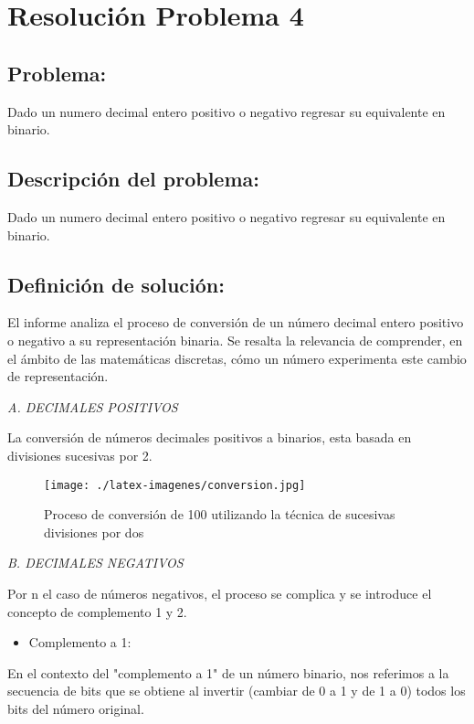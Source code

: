 \section{Resolución Problema 4}
\subsection{Problema:}
Dado un numero decimal entero positivo o negativo regresar su equivalente en binario.


\subsection{\textbf{Descripción del problema:}}
Dado un numero decimal entero positivo o negativo regresar su equivalente en binario.

\subsection{\textbf{Definición de solución:}}
El informe analiza el proceso de conversión de un número decimal entero positivo o negativo a su representación binaria. Se resalta la relevancia de comprender, en el ámbito de las matemáticas discretas, cómo un número experimenta este cambio de representación.
\newline


\item[{\ieeeguilsinglright}] {\it A. DECIMALES POSITIVOS }
   
La conversión de números decimales positivos a binarios, esta basada en divisiones sucesivas por 2. 
\newline

\begin{figure}
\centerline{\texttt{[image: ./latex-imagenes/conversion.jpg]}}
\caption{Proceso de conversión de 100 utilizando la técnica de sucesivas divisiones por dos}
\vspace*{-5pt}
\label{fig:dos}
\end{figure}


\item[{\ieeeguilsinglright}] {\it B. DECIMALES NEGATIVOS }

Por n el caso de números negativos, el proceso se complica y se introduce el concepto de complemento 1 y 2.

\begin{itemize}
    \item Complemento a 1:
\end{itemize}
En el contexto del "complemento a 1" de un número binario, nos referimos a la secuencia de bits que se obtiene al invertir (cambiar de 0 a 1 y de 1 a 0) todos los bits del número original. 
\newline


